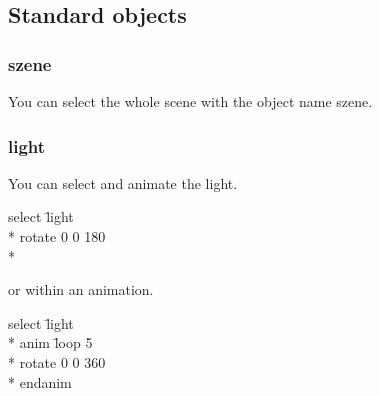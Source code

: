 \subsection{Standard objects}
\subsubsection{szene}
You can select the whole scene with the object name szene.

\subsubsection{light}
You can select and animate the light.
\tt{
\begin{tabbing}
select \=light\\*
  \>rotate 0 0 180\\*
\end{tabbing}
}
or within an animation.
\tt{
\begin{tabbing}
select \=light\\*
\>anim \=loop 5\\*
\>\>rotate 0 0 360\\*
\>endanim
\end{tabbing}
}


